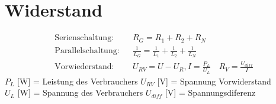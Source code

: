 \section*{Widerstand}

\begin{tcolorbox}[colback=white]
    \begin{align*}
        \text{Serienschaltung:}   &  & R_G = R_1 + R_2 + R_N                                                       \\
        \text{Parallelschaltung:} &  & \frac{1}{L_G} = \frac{1}{L_1} + \frac{1}{L_2} + \frac{1}{L_N}               \\
        \text{Vorwiederstand:}    &  & U_{RV} = U - U_R, I = \frac{P_L}{U_L} \hspace{1em} R_V = \frac{U_{diff}}{I}
    \end{align*}
    \tcblower
    \small $P_L$ [W] = Leistung des Verbrauchers \hspace{1em}  $U_{RV}$ [V] = Spannung Vorwiderstand  \\
    $U_L$ [W] = Spannung des Verbrauchers \hspace{0.5em} $U_{diff}$ [V] = Spannungsdiferenz
\end{tcolorbox}